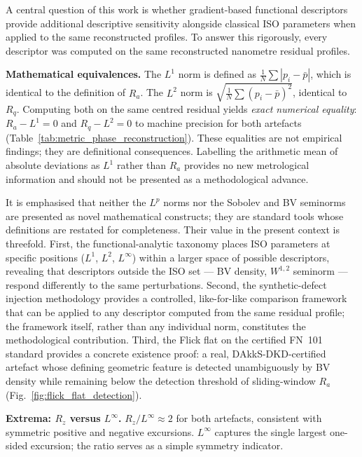 \documentclass[review]{elsarticle}
\begin{document}
A central question of this work is whether gradient-based functional descriptors provide additional descriptive sensitivity alongside classical ISO parameters when applied to the same reconstructed profiles. To answer this rigorously, every descriptor was computed on the same reconstructed nanometre residual profiles.

\textbf{Mathematical equivalences.} The $L^1$ norm is defined as $\frac{1}{N}\sum|p_i-\bar{p}|$, which is identical to the definition of $R_a$. The $L^2$ norm is $\sqrt{\frac{1}{N}\sum(p_i-\bar{p})^2}$, identical to $R_q$. Computing both on the same centred residual yields \emph{exact numerical equality}: $R_a-L^1=0$ and $R_q-L^2=0$ to machine precision for both artefacts (Table~\ref{tab:metric_phase_reconstruction}). These equalities are not empirical findings; they are definitional consequences. Labelling the arithmetic mean of absolute deviations as $L^1$ rather than $R_a$ provides no new metrological information and should not be presented as a methodological advance.

It is emphasised that neither the $L^p$ norms nor the Sobolev and BV seminorms are presented as novel mathematical constructs; they are standard tools whose definitions are restated for completeness. Their value in the present context is threefold. First, the functional-analytic taxonomy places ISO parameters at specific positions ($L^1$, $L^2$, $L^\infty$) within a larger space of possible descriptors, revealing that descriptors outside the ISO set — BV density, $W^{1,2}$ seminorm — respond differently to the same perturbations. Second, the synthetic-defect injection methodology provides a controlled, like-for-like comparison framework that can be applied to any descriptor computed from the same residual profile; the framework itself, rather than any individual norm, constitutes the methodological contribution. Third, the Flick flat on the certified FN~101 standard provides a concrete existence proof: a real, DAkkS-DKD-certified artefact whose defining geometric feature is detected unambiguously by BV density while remaining below the detection threshold of sliding-window $R_a$ (Fig.~\ref{fig:flick_flat_detection}).

\textbf{Extrema: $R_z$ versus $L^\infty$.} $R_z/L^\infty \approx 2$ for both artefacts, consistent with symmetric positive and negative excursions. $L^\infty$ captures the single largest one-sided excursion; the ratio serves as a simple symmetry indicator.
\end{document}
